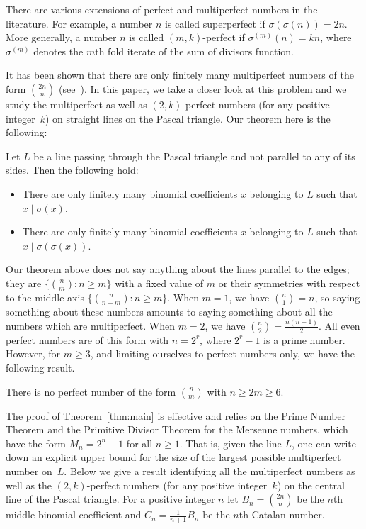 \documentclass[twoside,amsthm]{elsart}
\begin{document}
There are various extensions of perfect and multiperfect numbers in
the literature. For example, a number $n$ is called superperfect if
$\sigma(\sigma(n))=2n$. More generally, a number $n$ is called
$(m,k)$-perfect if $\sigma^{(m)}(n)=kn$, where $\sigma^{(m)}$
denotes the $m$th fold iterate of the sum of divisors function.

It has been shown that there are only finitely many multiperfect
numbers of the form $\binom{2n}{n}$ (see~\cite{L-P, L-S}). In this
paper, we take a closer look at this problem and we study the
multiperfect as well as $(2,k)$-perfect numbers (for any positive
integer~$k$) on straight lines on the Pascal triangle.
Our theorem here is the following:

\begin{thm}
\label{thm:main} Let $L$ be a line passing through the Pascal
triangle and not parallel to any of its sides. Then the following
hold:
\begin{itemize}\leftskip=10pt
\item[\normalfont (i)] There are only finitely many binomial 
coefficients $x$ belonging to $L$ such that $x\mid \sigma(x)$.
\item[\normalfont (ii)] There are only finitely many binomial 
coefficients $x$ belonging to $L$ such that 
$x\mid \sigma(\sigma(x))$.
\end{itemize}
\end{thm}

Our theorem above does not say anything about the lines parallel to
the edges; they are $\{\binom{n}{m}:n\ge m \}$ with a fixed value of
$m$ or their symmetries with respect to the middle axis
$\{\binom{n}{n-m}:n\ge m\}$. When $m=1$, we have $\binom{n}{1} = n$,
so saying something about these numbers amounts to saying something
about all the numbers which are multiperfect. When $m=2$, we have
$\binom{n}{2} = \frac{n(n-1)}{2}$. All even perfect numbers are of
this form with $n=2^r$, where $2^r-1$ is a prime number. However,
for $m \ge 3$, and limiting ourselves to perfect numbers only, we
have the following result.

\begin{thm}
\label{thm:kge3} There is no perfect number of the form
$\binom{n}{m}$ with $n\ge 2m\ge 6$.
\end{thm}

The proof of Theorem~\ref{thm:main} is effective and relies on the
Prime Number Theorem and the Primitive Divisor Theorem for the
Mersenne numbers, which have the form $M_n=2^n-1$ for all $n\ge 1$.
That is, given the line $L$, one can write down an explicit upper
bound for the size of the largest possible multiperfect number on~$L$.
Below we give a result identifying all the multiperfect numbers
as well as the $(2,k)$-perfect numbers (for any positive integer~$k$) 
on the central line of the Pascal triangle. For a positive
integer $n$ let $B_n=\binom{2n}{n}$ be the $n$th middle binomial
coefficient and $C_n=\frac{1}{n+1}B_n$ be the $n$th Catalan number.
\end{document}
